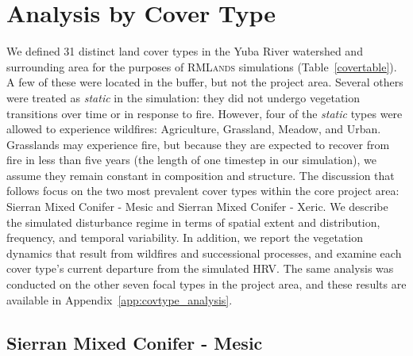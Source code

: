
\chapter{Analysis by Cover Type}
\label{ch:covtype}
We defined 31 distinct land cover types in the Yuba River watershed and surrounding area for the purposes of \textsc{RMLands} simulations (Table~\ref{covertable}). A few of these were located in the buffer, but not the project area. Several others were treated as \emph{static} in the simulation: they did not undergo vegetation transitions over time or in response to fire. However, four of the \emph{static} types were allowed to experience wildfires: Agriculture, Grassland, Meadow, and Urban. Grasslands may experience fire, but because they are expected to recover from fire in less than five years (the length of one timestep in our simulation), we assume they remain constant in composition and structure. The discussion that follows focus on the two most prevalent cover types within the core project area: Sierran Mixed Conifer - Mesic and Sierran Mixed Conifer - Xeric. We describe the simulated disturbance regime in terms of spatial extent and distribution, frequency, and temporal variability. In addition, we report the vegetation dynamics that result from wildfires and successional processes, and examine each cover type's current departure from the simulated HRV. The same analysis was conducted on the other seven focal types in the project area, and these results are available in Appendix~\ref{app:covtype_analysis}.






\section{Sierran Mixed Conifer - Mesic} 


